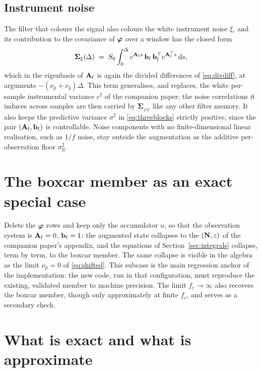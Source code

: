 \documentclass[11pt]{article}
\begin{document}
\subsection{Instrument noise}
\label{sec:noise}

The filter that colours the signal also colours the white instrument noise
$\xi$, and its contribution to the covariance of $\bm{\varphi}$ over a window has
the closed form
\begin{equation}
  \bm{\Sigma}_{\xi}(\Delta)
  \;=\;
  S_0 \int_0^{\Delta} e^{\mathbf{A}_{\mathrm{f}} s}\,\mathbf{b}_{\mathrm{f}}\,\mathbf{b}_{\mathrm{f}}^{\top} e^{\mathbf{A}_{\mathrm{f}}^{\top} s}\,
  \mathrm{d}s ,
  \label{eq:noise-gramian}
\end{equation}
which in the eigenbasis of $\mathbf{A}_{\mathrm{f}}$ is again the divided differences of
\eqref{eq:divdiff}, at arguments $-(\nu_p+\nu_q)\Delta$. This term
generalises, and replaces, the white per-sample instrumental variance
$\epsilon^2$ of the companion paper; the noise correlations it induces
across samples are then carried by $\bm{\Sigma}_{\!\varphi\varphi}$ like
any other filter memory. It also keeps the predictive variance $\sigma^2$
in \eqref{eq:threeblocks} strictly positive, since the pair $(\mathbf{A}_{\mathrm{f}},\mathbf{b}_{\mathrm{f}})$
is controllable. Noise components with no finite-dimensional linear
realisation, such as $1/f$ noise, stay outside the augmentation as the
additive per-observation floor $\sigma_{\mathrm{fl}}^2$.

\section{The boxcar member as an exact special case}

Delete the $\bm{\varphi}$ rows and keep only the accumulator $u$, so that the
observation system is $\mathbf{A}_{\mathrm{f}} = 0$, $\mathbf{b}_{\mathrm{f}} = 1$: the augmented state
collapses to the $(\mathbf{N}, z)$ of the companion paper's appendix, and the
equations of Section~\ref{sec:integrals} collapse, term by term, to the
boxcar member. The same collapse is visible in the algebra as the limit
$\nu_p = 0$ of \eqref{eq:shifted}. This subcase is the main regression
anchor of the implementation: the new code, run in that configuration,
must reproduce the existing, validated member to machine precision. The
limit $f_c \to \infty$ also recovers the boxcar member, though only
approximately at finite $f_c$, and serves as a secondary check.

\section{What is exact and what is approximate}
\end{document}
